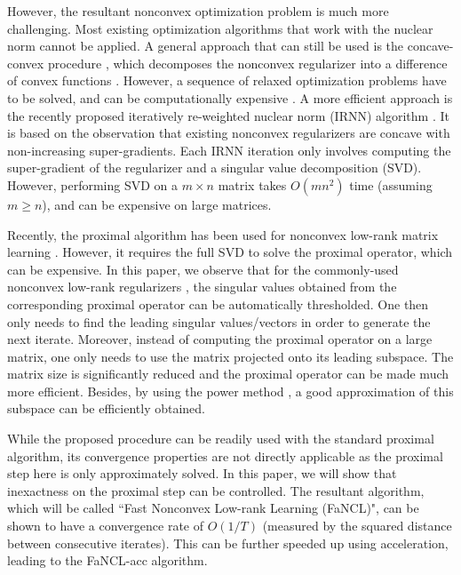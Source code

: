 \documentclass[10pt,journal,compsoc]{IEEEtran}
\begin{document}
However, the resultant nonconvex optimization problem is much more challenging.
Most existing optimization algorithms that work with the nuclear norm cannot be
applied. A general approach that can still be used is the concave-convex procedure \cite{yuille-03}, which
decomposes the nonconvex regularizer into a difference of convex functions
\cite{zhang2010analysis,hu2013fast}.  However, a sequence of relaxed optimization problems have to be solved,
and can be computationally expensive \cite{gongZLHY2013,li2015accelerated}.
A more efficient approach is the recently proposed iteratively re-weighted nuclear norm (\textsf{IRNN}) algorithm
\cite{lu2016nonconvex}. It is based on the observation that existing nonconvex regularizers are 
concave with
non-increasing
super-gradients.
Each
\textsf{IRNN} 
iteration only involves computing the 
super-gradient of the regularizer and a singular value decomposition (SVD).
However, performing SVD on a $m\times n$ matrix 
takes $O(mn^2)$
time
(assuming $m\geq n$), and can be expensive on 
large
matrices.

Recently, the proximal algorithm has 
been used for nonconvex low-rank matrix learning \cite{hu2013fast,lu2016nonconvex,lu2015generalized,oh2016partial}.
However, it requires the full SVD to solve the proximal operator, 
which can be expensive.
In this paper, we observe that for the commonly-used nonconvex low-rank
regularizers 
	\cite{zhang2010analysis, candes2008enhancing, hu2013fast,oh2016partial, fan2001variable,
	zhang2010nearly},
the singular values obtained from the corresponding proximal operator can be automatically  
thresholded.
One then only needs to find the leading singular values/vectors in order to generate the next iterate. 
Moreover, instead of computing the proximal operator on a large matrix, one only needs to
use the matrix projected onto its leading subspace. The matrix size is  
significantly reduced and the proximal operator can be made much more efficient.
Besides, by using the power method \cite{halko2011finding},
a good approximation of this subspace can be efficiently obtained.  

While the proposed procedure can be readily used with the standard proximal algorithm,
its convergence properties are not directly applicable as
the proximal step here is only approximately solved.
In this paper, we will show that inexactness on the proximal step can be controlled.
The resultant algorithm, which will be called ``Fast Nonconvex Low-rank Learning
(\textsf{FaNCL})",
can be shown to have a
convergence rate of $O(1/T)$ (measured by the squared distance between consecutive
iterates).
This can be further speeded up  using acceleration, leading to the 
\textsf{FaNCL-acc} algorithm.
\end{document}
